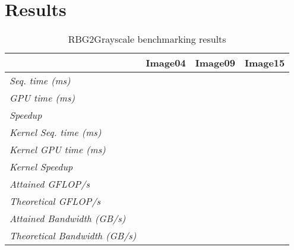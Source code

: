 \documentclass[final]{report}
\begin{document}
\section{Results}
\begin{table}[H]
	\centering
	\caption{RBG2Grayscale benchmarking results}
	\label{tab:rgb2grayscale-results}
	\begin{tabular}{llll}
	\toprule
											& \textbf{Image04} 	& \textbf{Image09} & \textbf{Image15} \\
	\midrule
	\textit{Seq. time (ms)} 				& ~ 				& ~ 				& ~ \\
	\textit{GPU time (ms)} 					& ~ 				& ~ 				& ~ \\
	\textit{Speedup} 						& ~ 				& ~ 				& ~ \\
	\midrule
	\textit{Kernel Seq. time (ms)} 			& ~ 				& ~ 				& ~ \\
	\textit{Kernel GPU time (ms)} 			& ~ 				& ~ 				& ~ \\
	\textit{Kernel Speedup} 				& ~ 				& ~ 				& ~ \\
	\midrule
	\textit{Attained GFLOP/s} 				& ~ 				& ~ 				& ~ \\
	\textit{Theoretical GFLOP/s} 			& ~ 				& ~ 				& ~ \\
	\textit{Attained Bandwidth (GB/s)}		& ~ 				& ~ 				& ~ \\
	\textit{Theoretical Bandwidth (GB/s)}	& ~ 				& ~ 				& ~ \\
	\bottomrule
	\end{tabular}
\end{table}
\end{document}
